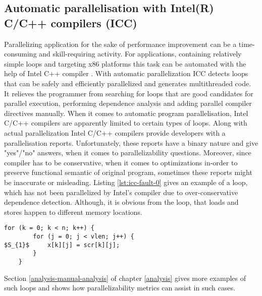 \subsection{Automatic parallelisation with Intel(R) C/C++ compilers (ICC)}
\qquad Parallelizing application for the sake of performance improvement can be a time-consuming and skill-requiring activity. For applications, containing relatively simple loops and targeting x86 platforms this task can be automated with the help of Intel C++ compiler \cite{intel-multithreading-guide}. With automatic parallelization ICC detects loops that can be safely and efficiently parallelized and generates multithreaded code. It relieves the programmer from searching for loops that are good candidates for parallel execution, performing dependence analysis and adding parallel compiler directives manually.\newline 
\null\qquad When it comes to automatic program parallelisation, Intel C/C++ compilers are apparently limited to certain types of loops. \newline \null\qquad Along with actual parallelization Intel C/C++ compilers provide developers with a parallelisation reports. Unfortunately, these reports have a binary nature and give "yes"/"no" answers, when it comes to parallelizability questions. Moreover, since compiler has to be conservative, when it comes to optimizations in-order to preserve functional semantic of original program, sometimes these reports might be inaccurate or misleading. Listing \ref{lst:icc-fault-0} gives an example of a loop, which has not been parallelized by Intel's compiler due to over-conservative dependence detection. Although, it is obvious from the loop, that loads and stores happen to different memory locations.
\begin{lstlisting}[caption={\textit{FT/src/fft3d.c:103} Algorithmically parallelizible loop. Intel compiler detects true and anti dependencies between $S_{1}$ statement executions on different loop iterations, despite the fact that these references address different arrays.}, captionpos=b, label=lst:icc-fault-0, float, floatplacement=H, mathescape=true]
	for (k = 0; k < n; k++) {
		for (j = 0; j < vlen; j++) {
$S_{1}$		x[k][j] = scr[k][j];
		}
	}
\end{lstlisting}\newline
\null\qquad Section \ref{analysis-manual-analysis} of chapter \ref{analysis} gives more examples of such loops and shows how parallelizability metrics can assist in such cases. 
